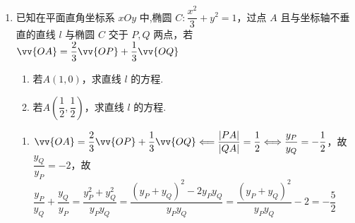 \begin{enumerate}
\begin{jieda}
\begin{enumerate}
            \item 方法3
            
            $\vv{OF} = \dfrac{2}{5}\vv{OP} + \dfrac{3}{5}\vv{OQ} \Longleftrightarrow \dfrac{|FP|}{|FQ|} = \dfrac{3}{2} \Longleftrightarrow \dfrac{y_P}{y_Q} = -\dfrac{3}{2}$，故$\dfrac{y_Q}{y_P} = -\dfrac{2}{3}$，故$\dfrac{y_P}{y_Q} + \dfrac{y_Q}{y_P} = \dfrac{y_P^2+y_Q^2}{y_Py_Q} = \dfrac{(y_P+y_Q)^2-2y_Py_Q}{y_Py_Q} = \dfrac{(y_P+y_Q)^2}{y_Py_Q} - 2 = -\dfrac{13}{6}$

            易知直线斜率为0时不符合要求，设$PQ: x = my + 1$，联立直线和椭圆方程$\left\{\begin{array}{l}
                 \dfrac{{x}^{2}}{4} + \dfrac{{y}^{2}}{3} = 1  \\
                 x = my + 1
            \end{array}\right.$，则$3(my + 1)^2 + 4y^2 = 12$，即$(3m^2+4)y^2+6my-9=0$，故$\left\{\begin{array}{l}
                 y_P+y_Q = \dfrac{-6m}{3m^2+4} \\
                 y_Py_Q = \dfrac{-9}{3m^2+4}
            \end{array}\right.$

            $\Delta > 0$，故有$\dfrac{(y_P+y_Q)^2}{y_Py_Q} - 2 = \dfrac{\left(\dfrac{-6m}{3m^2+4}\right)^2}{\dfrac{-9}{3m^2+4}} - 2 = \dfrac{-4m^2}{3m^2+4} - 2 = -\dfrac{13}{6}$

            即$\dfrac{-4m^2}{3m^2+4} = -\dfrac{1}{6}$，即$3m^2+4 = 24m^2$，故$m = \pm \dfrac{2}{\sqrt{21}}$, 所以直线方程为 $y =  \pm  \dfrac{\sqrt{21}}{2}\left( {x - 1}\right)$ .
        \end{enumerate}
    \end{jieda}
    
    \begin{vspace_}
    \vsp[5]
    \end{vspace_}
    \item 已知在平面直角坐标系 ${xOy}$ 中,椭圆 $C : \dfrac{{x}^{2}}{3} + y^2 = 1$，过点 $A$ 且与坐标轴不垂直的直线 $l$ 与椭圆 $C$ 交于 $P,Q$ 两点，若 $\vv{OA} = \dfrac{2}{3}\vv{OP} + \dfrac{1}{3}\vv{OQ}$
    \begin{enumerate}
        \item 若$A(1,0)$，求直线 $l$ 的方程.
        \item 若$A\left(\dfrac{1}{2},\dfrac{1}{2} \right)$，求直线 $l$ 的方程.
    \end{enumerate}
    \begin{jieda}
        \begin{enumerate}
            \item $\vv{OA} = \dfrac{2}{3}\vv{OP} + \dfrac{1}{3}\vv{OQ} \Longleftarrow  \dfrac{|PA|}{|QA|} = \dfrac{1}{2} \Longleftrightarrow \dfrac{y_P}{y_Q} = -\dfrac{1}{2}$，故$\dfrac{y_Q}{y_P} = -2$，故$\dfrac{y_P}{y_Q} + \dfrac{y_Q}{y_P} = \dfrac{y_P^2+y_Q^2}{y_Py_Q} = \dfrac{(y_P+y_Q)^2-2y_Py_Q}{y_Py_Q} = \dfrac{(y_P+y_Q)^2}{y_Py_Q} - 2 = -\dfrac{5}{2}$


\end{enumerate}
\end{jieda}
\end{enumerate}
